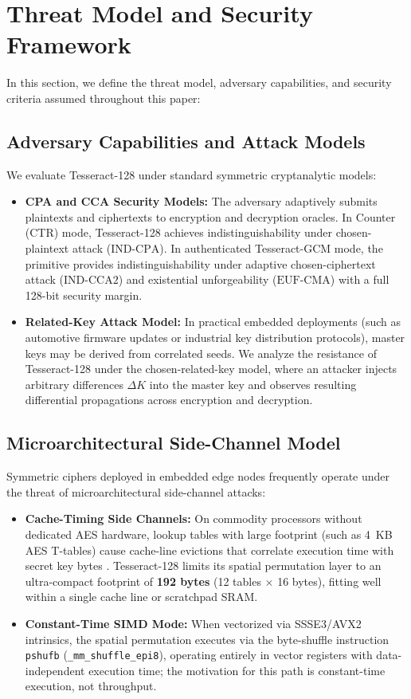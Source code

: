 \documentclass[10pt,twocolumn]{article}
\begin{document}
\section{Threat Model and Security Framework}
\label{sec:threat_model}

In this section, we define the threat model, adversary capabilities, and security criteria assumed throughout this paper:

\subsection{Adversary Capabilities and Attack Models}
We evaluate Tesseract-128 under standard symmetric cryptanalytic models:
\begin{itemize}
    \item \textbf{CPA and CCA Security Models:} The adversary adaptively submits plaintexts and ciphertexts to encryption and decryption oracles. In Counter (CTR) mode, Tesseract-128 achieves indistinguishability under chosen-plaintext attack ($\text{IND-CPA}$). In authenticated Tesseract-GCM mode, the primitive provides indistinguishability under adaptive chosen-ciphertext attack ($\text{IND-CCA2}$) and existential unforgeability ($\text{EUF-CMA}$) with a full 128-bit security margin.
    \item \textbf{Related-Key Attack Model:} In practical embedded deployments (such as automotive firmware updates or industrial key distribution protocols), master keys may be derived from correlated seeds. We analyze the resistance of Tesseract-128 under the chosen-related-key model, where an attacker injects arbitrary differences $\Delta K$ into the master key and observes resulting differential propagations across encryption and decryption.
\end{itemize}

\subsection{Microarchitectural Side-Channel Model}
Symmetric ciphers deployed in embedded edge nodes frequently operate under the threat of microarchitectural side-channel attacks:
\begin{itemize}
    \item \textbf{Cache-Timing Side Channels:} On commodity processors without dedicated AES hardware, lookup tables with large footprint (such as 4~KB AES T-tables) cause cache-line evictions that correlate execution time with secret key bytes \cite{gueron2010intel}. Tesseract-128 limits its spatial permutation layer to an ultra-compact footprint of \textbf{192 bytes} (12 tables $\times$ 16 bytes), fitting well within a single cache line or scratchpad SRAM.
    \item \textbf{Constant-Time SIMD Mode:} When vectorized via SSSE3/AVX2 intrinsics, the spatial permutation executes via the byte-shuffle instruction \texttt{pshufb} (\texttt{\_mm\_}\allowbreak\texttt{shuffle\_epi8}), operating entirely in vector registers with data-independent execution time; the motivation for this path is constant-time execution, not throughput.
\end{itemize}
\end{document}
